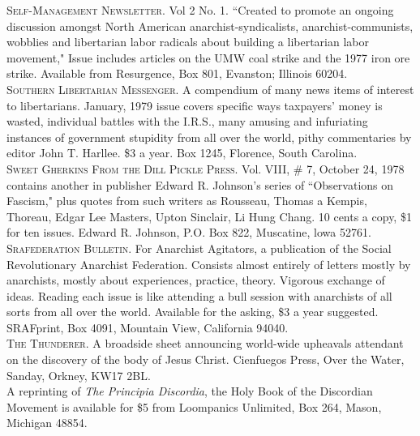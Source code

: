 \noindent \textsc{Self-Management Newsletter.} Vol 2 No. 1. ``Created to promote an ongoing discussion amongst North American anarchist-syndicalists, anarchist-communists, wobblies and libertarian labor radicals about building a libertarian labor movement," Issue includes articles on the UMW coal strike and the 1977 iron ore strike. Available from Resurgence, Box 801, Evanston; Illinois 60204.\\

\noindent \textsc{Southern Libertarian Messenger.} A compendium of many news items of interest to libertarians. January, 1979 issue covers specific ways taxpayers' money is wasted, individual battles with the I.R.S., many amusing and infuriating instances of government stupidity from all over the world, pithy commentaries by editor John T. Harllee. \$3 a year. Box 1245, Florence, South Carolina.\\

\noindent \textsc{Sweet Gherkins From the Dill Pickle Press.} Vol. VIII, \# 7, October 24, 1978 contains another in publisher Edward R. Johnson's series of ``Observations on Fascism," plus quotes from such writers as Rousseau, Thomas a Kempis, Thoreau, Edgar Lee Masters, Upton Sinclair, Li Hung Chang. 10 cents a copy, \$1 for ten issues. Edward R. Johnson, P.O. Box 822, Muscatine, lowa 52761.\\

\noindent \textsc{Srafederation Bulletin.} For Anarchist Agitators, a publication of the Social Revolutionary Anarchist Federation. Consists almost entirely of letters mostly by anarchists, mostly about experiences, practice, theory. Vigorous exchange of ideas. Reading each issue is like attending a bull session with anarchists of all sorts from all over the world. Available for the asking, \$3 a year suggested. SRAFprint, Box 4091, Mountain View, California 94040.\\

\noindent \textsc{The Thunderer.} A broadside sheet announcing world-wide upheavals attendant on the discovery of the body of Jesus Christ. Cienfuegos Press, Over the Water, Sanday, Orkney, KW17 2BL.\\

\noindent A reprinting of \emph{The Principia Discordia}, the Holy Book of the Discordian Movement is available for \$5 from Loompanics Unlimited, Box 264, Mason, Michigan 48854.